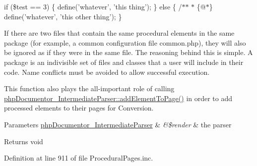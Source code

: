 {\ttfamily  if (\$test == 3) \{ define('whatever', 'this thing'); \} else \{ /$\ast$$\ast$ $\ast$  \{@$\ast$\} define('whatever', 'this other thing'); \} }

\-If there are two files that contain the same procedural elements in the same package (for example, a common configuration file common.\-php), they will also be ignored as if they were in the same file. \-The reasoning behind this is simple. \-A package is an indivisible set of files and classes that a user will include in their code. \-Name conflicts must be avoided to allow successful execution.

\-This function also plays the all-\/important role of calling \hyperlink{classphp_documentor___intermediate_parser_a472495aecca12ff9b77368f1b2bb0415}{php\-Documentor\-\_\-\-Intermediate\-Parser\-::add\-Element\-To\-Page()} in order to add processed elements to their pages for \-Conversion.


\begin{DoxyParams}[1]{\-Parameters}
\hyperlink{classphp_documentor___intermediate_parser}{php\-Documentor\-\_\-\-Intermediate\-Parser} & {\em \&\$render} & the parser\\
\hline
\end{DoxyParams}
\begin{DoxyReturn}{\-Returns}
void 
\end{DoxyReturn}


\-Definition at line 911 of file \-Procedural\-Pages.\-inc.


